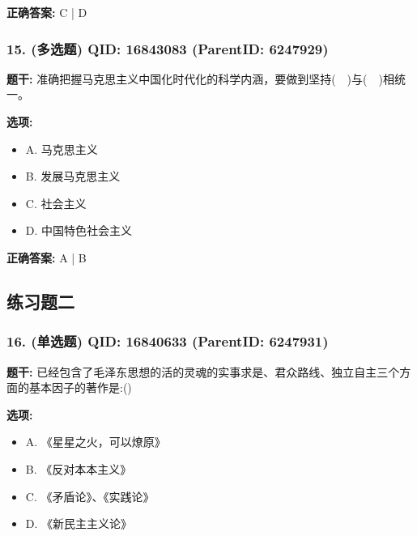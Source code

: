\documentclass[12pt,UTF8]{ctexart}
\begin{document}
\textbf{正确答案:}
C | D

\vspace{0.3em}\hrulefill\vspace{0.7em}

\subsubsection*{15. (多选题) \small QID: 16843083 (ParentID: 6247929)}

\textbf{题干:}
准确把握马克思主义中国化时代化的科学内涵，要做到坚持(  )与(  )相统一。



\textbf{选项:}
\begin{itemize}[leftmargin=*]

  \item A. 马克思主义

  \item B. 发展马克思主义

  \item C. 社会主义

  \item D. 中国特色社会主义

\end{itemize}

\textbf{正确答案:}
A | B

\vspace{0.3em}\hrulefill\vspace{0.7em}

\subsection*{练习题二}

\subsubsection*{16. (单选题) \small QID: 16840633 (ParentID: 6247931)}

\textbf{题干:}
已经包含了毛泽东思想的活的灵魂的实事求是、君众路线、独立自主三个方面的基本因子的著作是:()



\textbf{选项:}
\begin{itemize}[leftmargin=*]

  \item A. 《星星之火，可以燎原》

  \item B. 《反对本本主义》

  \item C. 《矛盾论》、《实践论》

  \item D. 《新民主主义论》

\end{itemize}
\end{document}
